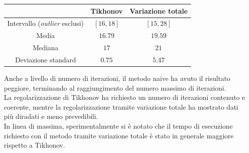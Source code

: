 \documentclass[11pt]{article}
\begin{document}
\begin{center}
    \begin{tabular}{ |c|c|c| }
    \hline
    & Tikhonov & Variazione totale \\ 
    \hline
    Intervallo (\emph{outlier} esclusi) & $[16, 18]$ & $[15, 28]$ \\
    Media & $16.79$ & $19.59$ \\
    Mediana & $17$ & $21$ \\
    Deviazione standard & $0.75$ & $5.47$ \\
    \hline
    \end{tabular}
\end{center}
Anche a livello di numero di iterazioni, il metodo naive ha avuto il risultato peggiore, terminando al raggiungimento del numero massimo di iterazioni.\\
La regolarizzazione di Tikhonov ha richiesto un numero di iterazioni contenuto e coerente, mentre la regolarizzazione tramite variazione totale ha mostrato dati più diradati e meno prevedibili.\\
In linea di massima, sperimentalmente si è notato che il tempo di esecuzione richiesto con il metodo tramite variazione totale è stato in generale maggiore rispetto a Tikhonov.
\end{document}
